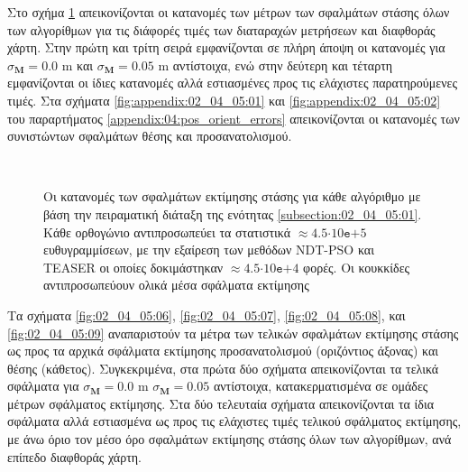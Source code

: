 Στο σχήμα \ref{fig:02_04_05:05} απεικονίζονται οι κατανομές των μέτρων των
σφαλμάτων στάσης όλων των αλγορίθμων για τις διάφορές τιμές των διαταραχών
μετρήσεων και διαφθοράς χάρτη. Στην πρώτη και τρίτη σειρά εμφανίζονται σε πλήρη
άποψη οι κατανομές για $\sigma_{\bm{M}} = 0.0$ m και $\sigma_{\bm{M}} = 0.05$ m
αντίστοιχα, ενώ στην δεύτερη και τέταρτη εμφανίζονται οι ίδιες κατανομές αλλά
εστιασμένες προς τις ελάχιστες παρατηρούμενες τιμές. Στα σχήματα
\ref{fig:appendix:02_04_05:01} και \ref{fig:appendix:02_04_05:02} του
παραρτήματος \ref{appendix:04:pos_orient_errors} απεικονίζονται οι κατανομές
των συνιστώντων σφαλμάτων θέσης και προσανατολισμού.


\begin{figure}\centering\vspace{2cm}
  \begin{subfigure}{\linewidth}\hspace{-1cm}
    
  \end{subfigure}\\\vspace{3cm}%
  \begin{subfigure}{\linewidth}\hspace{-1cm}
    
  \end{subfigure}%
  \vspace{1cm}
\caption{\small Οι κατανομές των σφαλμάτων εκτίμησης στάσης για κάθε αλγόριθμο
         με βάση την πειραματική διάταξη της ενότητας
         \ref{subsection:02_04_05:01}. Κάθε ορθογώνιο αντιπροσωπεύει τα
         στατιστικά $\approx 4.5$$\cdot$$10\texttt{e}$$+$$5$ ευθυγραμμίσεων, με
         την εξαίρεση των μεθόδων NDT-PSO και TEASER οι οποίες δοκιμάστηκαν
         $\approx 4.5$$\cdot$$10\texttt{e}$$+$$4$ φορές. Οι κουκκίδες
         αντιπροσωπεύουν ολικά μέσα σφάλματα εκτίμησης}
\label{fig:02_04_05:05}
\end{figure}


Τα σχήματα \ref{fig:02_04_05:06}, \ref{fig:02_04_05:07}, \ref{fig:02_04_05:08},
και \ref{fig:02_04_05:09} αναπαριστούν τα μέτρα των τελικών σφαλμάτων εκτίμησης
στάσης ως προς τα αρχικά σφάλματα εκτίμησης προσανατολισμού (οριζόντιος άξονας)
και θέσης (κάθετος). Συγκεκριμένα, στα πρώτα δύο σχήματα απεικονίζονται τα
τελικά σφάλματα για $\sigma_{\bm{M}} = 0.0$ m $\sigma_{\bm{M}} = 0.05$
αντίστοιχα, κατακερματισμένα σε ομάδες μέτρων σφάλματος εκτίμησης. Στα δύο
τελευταία σχήματα απεικονίζονται τα ίδια σφάλματα αλλά εστιασμένα ως προς τις
ελάχιστες τιμές τελικού σφάλματος εκτίμησης, με άνω όριο τον μέσο όρο σφαλμάτων
εκτίμησης στάσης όλων των αλγορίθμων, ανά επίπεδο διαφθοράς χάρτη.



